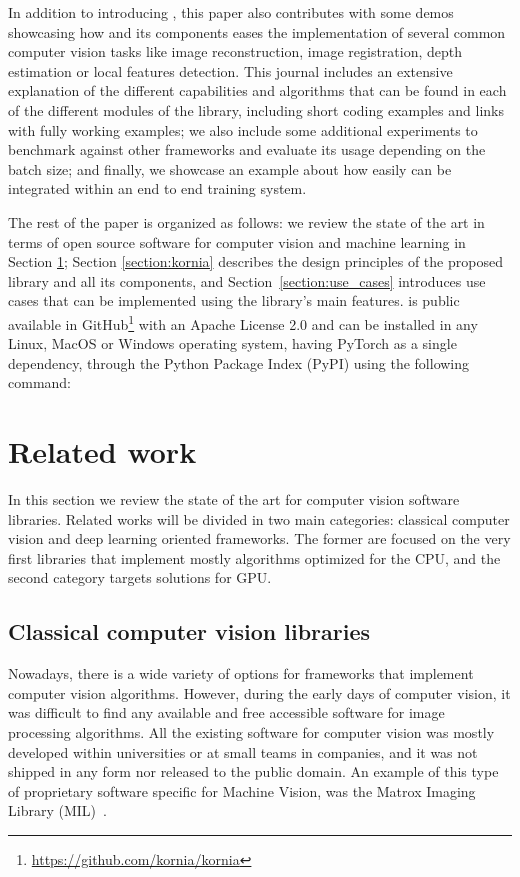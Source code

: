 In addition to introducing \lib, this paper also contributes with some demos showcasing how \lib{} and its components eases the implementation of several common computer vision tasks like image reconstruction, image registration, depth estimation or local features detection. This journal includes an extensive explanation of the different capabilities and algorithms that can be found in each of the different modules of the library, including short coding examples and links with fully working examples; we also include some additional experiments to benchmark against other frameworks and evaluate its usage depending on the batch size; and finally, we showcase an example about how easily can \lib{} be integrated within an end to end training system.

The rest of the paper is organized as follows: we review the state of the art in terms of open source software for computer vision and machine learning in Section \ref{section:related_work}; Section \ref{section:kornia} describes the design principles of the proposed library and all its components, and Section~\ref{section:use_cases} introduces use cases that can be implemented using the library's main features. \lib{} is public available in GitHub\footnote{\url{https://github.com/kornia/kornia}} with an Apache License 2.0 and can be installed in any Linux, MacOS or Windows operating system, having PyTorch as a single dependency, through the Python Package Index (PyPI) using the following command:


\section{Related work}
\label{section:related_work}
In this section we  review  the state of the art for computer vision software libraries. Related works will be divided in two main categories: classical computer vision and deep learning oriented  frameworks. The former are focused on  the very first libraries that implement mostly algorithms optimized for the CPU, and the second category targets solutions for GPU.

\subsection{Classical computer vision libraries}
\label{section:related_work:traditional_vision}
Nowadays, there is a wide variety of options for frameworks that implement computer vision algorithms. However, during the early days of computer vision, it was difficult to find any available and free accessible software for image processing algorithms. All the existing software for computer vision was mostly developed within universities or at small teams in companies, and it was not shipped in any form nor released to the public domain. An example of this type of proprietary software specific for Machine Vision, was the Matrox Imaging Library (MIL)~\citep{matrox_imaging}.


